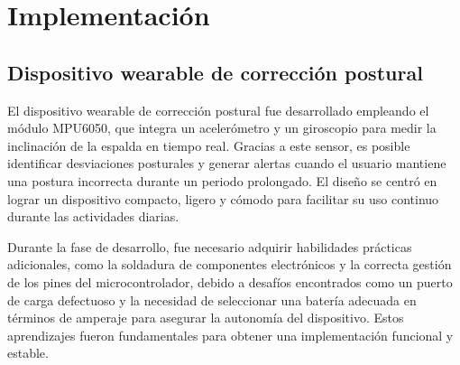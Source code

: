 \documentclass[manuscript,screen,review]{acmart}
\begin{document}
\section{Implementaci\'on}

\subsection{Dispositivo wearable de corrección postural}
El dispositivo wearable de corrección postural fue desarrollado empleando el módulo MPU6050, que integra un acelerómetro y un giroscopio para medir la inclinación de la espalda en tiempo real. Gracias a este sensor, es posible identificar desviaciones posturales y generar alertas cuando el usuario mantiene una postura incorrecta durante un periodo prolongado. El diseño se centró en lograr un dispositivo compacto, ligero y cómodo para facilitar su uso continuo durante las actividades diarias.

Durante la fase de desarrollo, fue necesario adquirir habilidades prácticas adicionales, como la soldadura de componentes electrónicos y la correcta gestión de los pines del microcontrolador, debido a desafíos encontrados como un puerto de carga defectuoso y la necesidad de seleccionar una batería adecuada en términos de amperaje para asegurar la autonomía del dispositivo. Estos aprendizajes fueron fundamentales para obtener una implementación funcional y estable.
\end{document}
